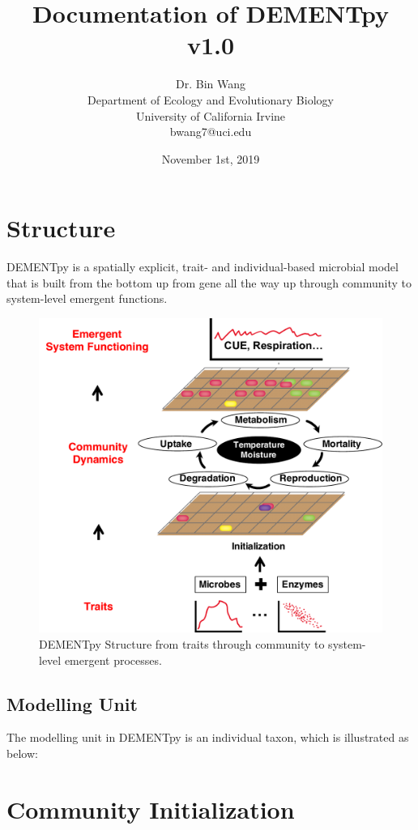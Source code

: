 \documentclass[12pt, oneside, titlepage]{article}   	%
\title{\textbf{Documentation of DEMENTpy v1.0}}
\author{Dr. Bin Wang\\Department of Ecology and Evolutionary Biology\\University of California Irvine\\bwang7@uci.edu}
\date{November 1st, 2019}
\begin{document}
\maketitle

\section{Structure}
DEMENTpy is a spatially explicit, trait- and individual-based microbial model that is built from the bottom up from gene all the way up through community to system-level emergent functions.  

\begin{figure}[H]
  \centering
  \includegraphics[width=\linewidth]{Fig1_Structure.pdf}
  \caption{DEMENTpy Structure from traits through community to system-level emergent processes.}
  \label{fig:structure}
\end{figure}

\subsection{Modelling Unit}
The modelling unit in DEMENTpy is an individual taxon, which is illustrated as below:


\section{Community Initialization}
\end{document}
